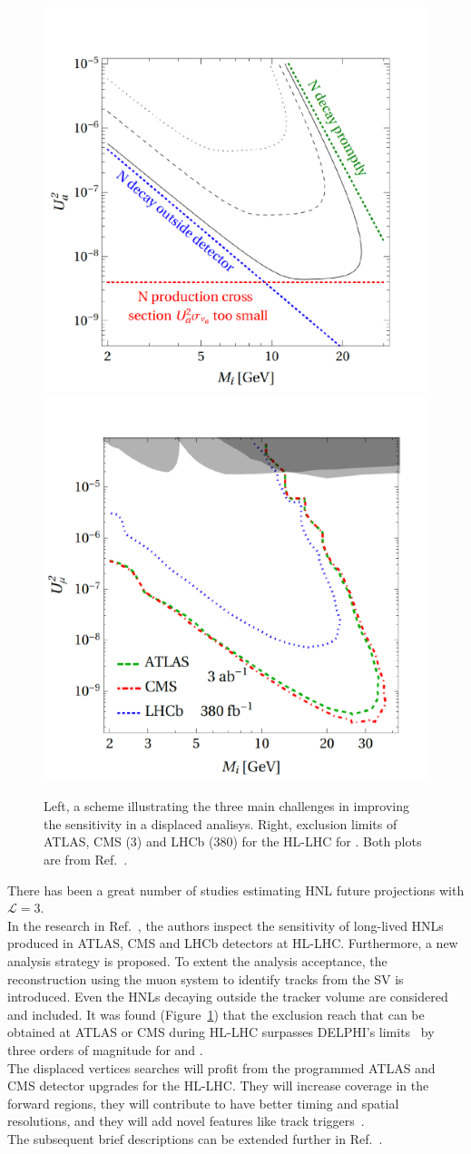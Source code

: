 \begin{figure}[h!]
\centering
    \includegraphics[clip,trim=0.cm 0cm 0cm 2cm, width=.38\textwidth]{Figures/c7/marco_god.pdf}
    \includegraphics[clip,trim=0.cm 0cm 0cm 2cm, width=.37\textwidth]{Figures/c7/marco_mu_HL.pdf}
\caption{Left, a scheme illustrating the three main challenges in
  improving the sensitivity in a displaced analisys. Right, exclusion
  limits of ATLAS, CMS (3\abinv) and LHCb (380\fbinv)
 for the HL-LHC for \mixparm. Both plots are
  from Ref.~\cite{Drewes_2020_jan}. }
\label{fig:marco_sketch_ll}
\end{figure}

There has been a great number of studies estimating HNL future
projections with $\mathcal{L} = 3$\abinv.\\
In the research in Ref.~\cite{Drewes_2020_jan}, the authors inspect the
sensitivity of long-lived HNLs produced in ATLAS, CMS and LHCb
detectors at HL-LHC. Furthermore, a new analysis strategy is proposed. To extent
the analysis acceptance, the reconstruction using the muon system to identify tracks from the
SV is introduced. Even the HNLs decaying outside the tracker
volume are considered and included. It was found
(Figure~\ref{fig:marco_sketch_ll}) that the exclusion
reach that can be obtained at ATLAS or CMS during HL-LHC surpasses
DELPHI's limits~\cite{Abreu:1996pa} by three orders of magnitude for
\mixparm and \mixpare.\\


The displaced vertices
searches will profit from the programmed ATLAS and CMS detector
upgrades for the HL-LHC. 
They will increase coverage in the forward regions, they
will contribute to have better timing and spatial resolutions, and
they will add novel features like track
triggers~\cite{Alimena_2020}.\\
The subsequent brief descriptions can be extended further
in
Ref.~\cite{CERN-LHCC-2017-009,CERN-LHCC-2017-011,CERN-LHCC-2017-012,CERN-LHCC-2017-027,CERN-LHCC-2017-013}.

